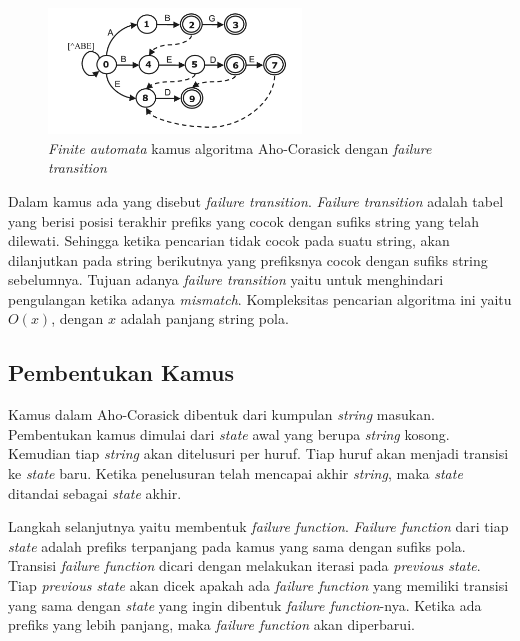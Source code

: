     \begin{figure}[htb]
      \centering
      \includegraphics[width=0.6\textwidth]{resources/aho-c.png}
      \caption[\emph{Finite automata} kamus algoritma Aho-Corasick dengan \emph{failure transition}]{\emph{Finite automata} kamus algoritma Aho-Corasick dengan \emph{failure transition} \citep{lin2013}}
    \end{figure}


    Dalam kamus ada yang disebut \emph{failure transition}. \emph{Failure transition} adalah tabel yang berisi posisi terakhir prefiks yang cocok dengan sufiks string yang telah dilewati. Sehingga ketika pencarian tidak cocok pada suatu string, akan dilanjutkan pada string berikutnya yang prefiksnya cocok dengan sufiks string sebelumnya. Tujuan adanya \emph{failure transition} yaitu untuk menghindari pengulangan ketika adanya \emph{mismatch}. Kompleksitas pencarian algoritma ini yaitu $O(x)$, dengan $x$ adalah panjang string pola.

  \subsection {Pembentukan Kamus}

    Kamus dalam Aho-Corasick dibentuk dari kumpulan \emph{string} masukan. Pembentukan kamus dimulai dari \emph{state} awal yang berupa \emph{string} kosong. Kemudian tiap \emph{string} akan ditelusuri per huruf. Tiap huruf akan menjadi transisi ke \emph{state} baru. Ketika penelusuran telah mencapai akhir \emph{string}, maka \emph{state} ditandai sebagai \emph{state} akhir.

    Langkah selanjutnya yaitu membentuk \emph{failure function}. \emph{Failure function} dari tiap \emph{state} adalah prefiks terpanjang pada kamus yang sama dengan sufiks pola. Transisi \emph{failure function} dicari dengan melakukan iterasi pada \emph{previous state}. Tiap \emph{previous state} akan dicek apakah ada \emph{failure function} yang memiliki transisi yang sama dengan \emph{state} yang ingin dibentuk \emph{failure function}-nya. Ketika ada prefiks yang lebih panjang, maka \emph{failure function} akan diperbarui.
    
